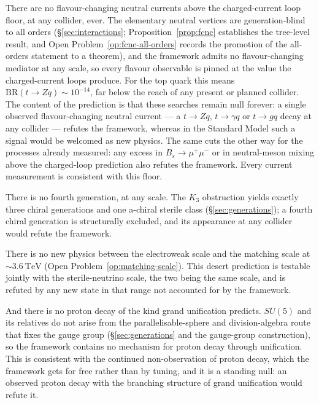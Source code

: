 There are no flavour-changing neutral currents above the charged-current loop floor, at any collider,
ever. The elementary neutral vertices are generation-blind to all orders (\S\ref{sec:interactions};
Proposition~\ref{prop:fcnc} establishes the tree-level result, and
Open Problem~\ref{op:fcnc-all-orders} records the promotion of the all-orders statement to a
theorem), and the framework admits no flavour-changing mediator at any scale, so every flavour
observable is pinned at the value the charged-current loops produce. For the top quark this means
$\mathrm{BR}(t\to Zq)\sim 10^{-14}$, far below the reach of any present or planned collider. The
content of the prediction is that these searches remain null forever: a single observed
flavour-changing neutral current --- a $t\to Zq$, $t\to\gamma q$ or $t\to gq$ decay at any collider
--- refutes the framework, whereas in the Standard Model such a signal would be welcomed as new
physics. The same cuts the other way for the processes already measured: any excess in
$B_s\to\mu^+\mu^-$ or in neutral-meson mixing above the charged-loop prediction also refutes the
framework. Every current measurement is consistent with this floor.

There is no fourth generation, at any scale. The $K_3$ obstruction yields exactly three chiral
generations and one a-chiral sterile class (\S\ref{sec:generations}); a fourth chiral generation is
structurally excluded, and its appearance at any collider would refute the framework.

There is no new physics between the electroweak scale and the matching scale at
$\sim 3.6\ \mathrm{TeV}$ (Open Problem~\ref{op:matching-scale}). This desert prediction is testable
jointly with the sterile-neutrino scale, the two being the same scale, and is refuted by any new
state in that range not accounted for by the framework.

And there is no proton decay of the kind grand unification predicts. $SU(5)$ and its relatives do not
arise from the parallelisable-sphere and division-algebra route that fixes the gauge group
(\S\ref{sec:generations} and the gauge-group construction), so the framework contains no mechanism
for proton decay through unification. This is consistent with the continued non-observation of proton
decay, which the framework gets for free rather than by tuning, and it is a standing null: an
observed proton decay with the branching structure of grand unification would refute it.

